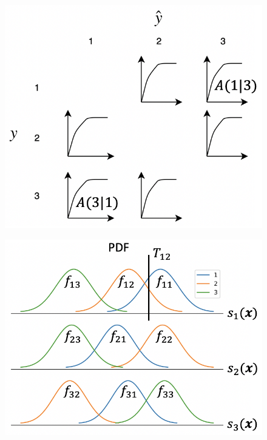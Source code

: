 \documentclass[twoside,11pt]{article}
\renewcommand{\>}{{\rightarrow}}
\newcommand{\1}{{\mathbf 1}}
\newcommand{\0}{{\mathbf 0}}
\begin{document}

\begin{figure}
\centering
\begin{minipage}{.5\textwidth}
  \centering
  \includegraphics[width=.6\linewidth]{pic/pairwise.png}
  \label{fig:pairwise}
\end{minipage}%
\begin{minipage}{.5\textwidth}
  \centering
  \includegraphics[width=.6\linewidth]{pic/PDF.png}
  \label{fig:PDF}
\end{minipage}
\end{figure}
\end{document}

